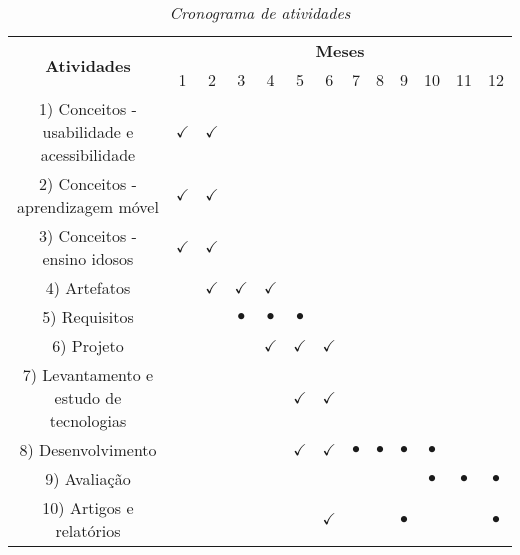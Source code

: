 \begin{table}[!ht]
\centering
\caption{\textit{Cronograma de atividades}}
\label{tab:cronograma}
\begin{tabular}{|c|c|c|c|c|c|c|c|c|c|c|c|c|}
\hline
\multirow{2}{*}{\textbf{Atividades}} & \multicolumn{12}{c|}{\textbf{Meses}} \\ \cline{2-13} 
 & 1 & 2 & 3 & 4 & 5 & 6 & 7 & 8 & 9 & 10 & 11 & 12 \\ \hline
1) Conceitos - usabilidade e acessibilidade & $\checkmark$ & $\checkmark$ &  &  &  &  &  &  &  &  &  &  \\ \hline
2) Conceitos - aprendizagem móvel & $\checkmark$ & $\checkmark$ &  &  &  &  &  &  &  &  &  &  \\ \hline
3) Conceitos - ensino idosos & $\checkmark$ & $\checkmark$ &  &  &  &  &  &  &  &  &  &  \\ \hline
4) Artefatos &  & $\checkmark$ & $\checkmark$ & $\checkmark$ &  &  &  &  &  &  &  &  \\ \hline
5) Requisitos &  &  & $\bullet$ & $\bullet$ & $\bullet$ &  &  &  &  &  &  &  \\ \hline
6) Projeto &  &  &  & $\checkmark$ & $\checkmark$ & $\checkmark$ &  &  &  &  &  &  \\ \hline
7) Levantamento e estudo de tecnologias &  &  &  &  & $\checkmark$ & $\checkmark$ &  &  &  &  &  &  \\ \hline
8) Desenvolvimento &  &  &  &  & $\checkmark$ & $\checkmark$ & $\bullet$ & $\bullet$ & $\bullet$ & $\bullet$ &  &  \\ \hline
9) Avaliação &  &  &  &  &  &  &  &  &  & $\bullet$ & $\bullet$ & $\bullet$ \\ \hline
10) Artigos e relatórios &  &  &  &  &  & $\checkmark$ &  &  & $\bullet$ &  &  & $\bullet$ \\ \hline
\end{tabular}
\end{table}